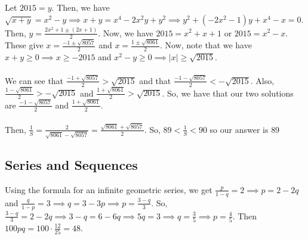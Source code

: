 \documentclass[11pt]{article}
\begin{document}

\begin{sol}
Let $2015=y$. Then, we have $\sqrt{x+y}=x^2-y\implies x+y=x^4-2x^2y+y^2\implies y^2+(-2x^2-1)y+x^4-x=0$. Then, $y=\frac{2x^2+1 \pm (2x+1)}{2}$. Now, we have $2015=x^2+x+1$ or $2015=x^2-x$. These give $x=\frac{-1 \pm \sqrt{8057}}{2}$ and $x=\frac{1 \pm \sqrt{8061}}{2}$. Now, note that we have $x+y\ge 0 \implies x \ge -2015$ and $x^2-y\ge 0\implies |x|\ge \sqrt{2015}$. \\
\\
We can see that $\frac{-1 + \sqrt{8057}}{2}>\sqrt{2015}$ and that $\frac{-1-\sqrt{8057}}{2} < -\sqrt{2015}$. Also, $\frac{1-\sqrt{8061}}{2} > - \sqrt{2015}$ and $\frac{1+\sqrt{8061}}{2} > \sqrt{2015}$. So, we have that our two solutions are $\frac{-1-\sqrt{8057}}{2}$ and $\frac{1+\sqrt{8061}}{2}$. \\
\\
Then, $\frac{1}{S}=\frac{2}{\sqrt{8061}-\sqrt{8057}}=\frac{\sqrt{8061}+\sqrt{8057}}{2}$. So, $89 < \frac{1}{S} < 90$ so our answer is $\boxed{89}$
\end{sol}

\subsection{Series and Sequences}

\begin{sol}
Using the formula for an infinite geometric series, we get $\frac{p}{1-q}=2\implies p=2-2q$ and $\frac{q}{1-p}=3\implies q=3-3p\implies p=\frac{3-q}{3}$. So, $\frac{3-q}{3}=2-2q\implies 3-q=6-6q\implies 5q=3\implies q =\frac{3}{5}\implies p =\frac{4}{5}$. Then $100pq=100\cdot \frac{12}{25}=\boxed{48}$.
\end{sol}

\end{document}
